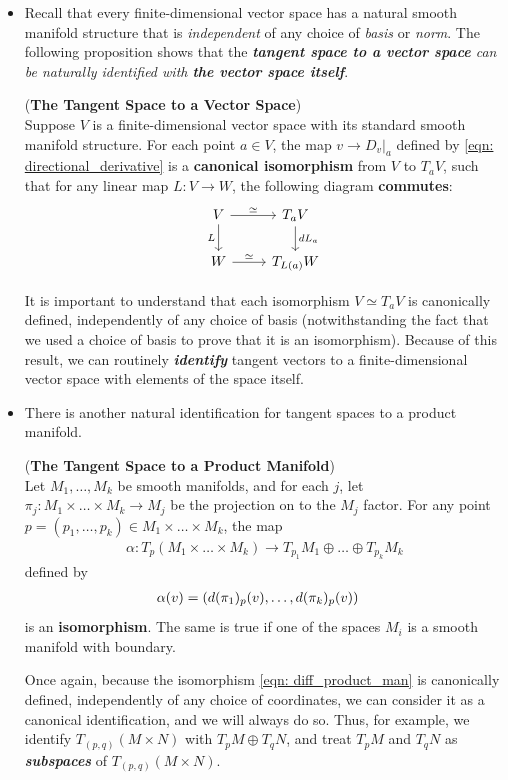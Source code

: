 \documentclass[11pt]{article}
\begin{document}
\begin{itemize}
\item Recall that every finite-dimensional vector space has a natural smooth manifold structure that is \emph{independent} of any choice of \emph{basis} or \emph{norm}. The following proposition shows that the \emph{\textbf{tangent space to a vector space} can be naturally identified with \textbf{the vector space itself}}.

\begin{proposition} (\textbf{The Tangent Space to a Vector Space}) \citep{lee2003introduction} \\
Suppose $V$ is a finite-dimensional vector space with its standard smooth manifold structure. For each point $a \in V$, the map $v \rightarrow D_v\big|_a$ defined by \eqref{eqn: directional_derivative} is a \textbf{canonical isomorphism} from $V$ to $T_{a}V$, such that for any linear map $L: V \rightarrow W$, the following diagram \textbf{commutes}:
\[
  \begin{tikzcd}
    V \arrow{r}{\simeq} \arrow[swap]{d}{L} & T_{a}V \arrow{d}{dL_{a}} \\
    W \arrow{r}{\simeq} & T_{L(a)}W
  \end{tikzcd}
\]
\end{proposition}

It is important to understand that each isomorphism $V \simeq T_a V$ is canonically defined, independently of any choice of basis (notwithstanding the fact that we used a choice of basis to prove that it is an isomorphism). Because of this result, we can routinely \emph{\textbf{identify}} tangent vectors to a finite-dimensional vector space with elements of the space itself.

\item There is another natural identification for tangent spaces to a product manifold.
\begin{proposition} (\textbf{The Tangent Space to a Product Manifold}) \citep{lee2003introduction} \\
 Let $M_1 ,\ldots, M_k$  be smooth manifolds, and for each $j$, let $\pi_j: M_1 \times \ldots \times M_k \rightarrow M_j$ be the projection on to the $M_j$ factor. For any point $p = (p_1, \ldots, p_k) \in M_1 \times \ldots \times M_k$, the map
\begin{align*}
\alpha: T_{p}(M_1 \times \ldots \times M_k) \rightarrow T_{p_1}M_1 \oplus \ldots \oplus T_{p_k}M_k
\end{align*} defined by
\begin{align}
\alpha(v) &= \left(d(\pi_1)_p(v), \ldots, d(\pi_k)_p(v)\right) \label{eqn: diff_product_man}
\end{align} is an \textbf{isomorphism}. The same is true if one of the spaces $M_i$ is a smooth manifold with boundary.
\end{proposition} Once again, because the isomorphism \eqref{eqn: diff_product_man} is canonically defined, independently of any choice of coordinates, we can consider it as a canonical identification, and we will always do so. Thus, for example, we identify $T_{(p,q)}(M \times N)$ with $T_{p}M \oplus T_{q}N$, and treat $T_{p}M$ and $T_{q}N$ as \emph{\textbf{subspaces}} of $T_{(p,q)}(M \times N)$.
\end{itemize}
\end{document}
